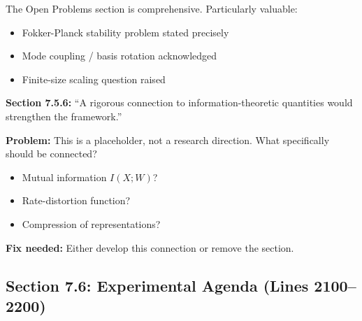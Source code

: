 \documentclass[11pt]{article}
\begin{document}
\begin{insightbox}
The Open Problems section is comprehensive. Particularly valuable:
\begin{itemize}
    \item Fokker-Planck stability problem stated precisely
    \item Mode coupling / basis rotation acknowledged
    \item Finite-size scaling question raised
\end{itemize}
\end{insightbox}

\begin{handwavebox}
\textbf{Section 7.5.6:} ``A rigorous connection to information-theoretic quantities would strengthen the framework.''

\textbf{Problem:} This is a placeholder, not a research direction. What specifically should be connected?
\begin{itemize}
    \item Mutual information $I(X; W)$?
    \item Rate-distortion function?
    \item Compression of representations?
\end{itemize}

\textbf{Fix needed:} Either develop this connection or remove the section.
\end{handwavebox}

\subsection{Section 7.6: Experimental Agenda (Lines 2100--2200)}
\end{document}
